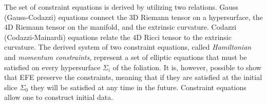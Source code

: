 The set of constraint equations is derived by utilizing two relations.
Gauss (Gauss-Codazzi) equations connect the $3$D Riemann tensor on a hypersurface, the
$4$D Riemann tensor on the manifold, and the extrinsic curvature. 
Codazzi (Codazzi-Mainardi) equations relate the $4$D Ricci tensor to the extrinsic curvature. 
%
%
The derived system of two constraint equations, called 
\textit{Hamiltonian} and \textit{momentum constraints}, 
represent a set of elliptic equations that must be satisfied on 
every hypersurface $\Sigma_i$ of the foliation. 
%
It is, however, possible to show that \ac{EFE} preserve the constraints, 
meaning that if they are satisfied at the initial slice $\Sigma_0$ 
they will be satisfied at any time in the future.
%
Constraint equations allow one to construct initial data. 



